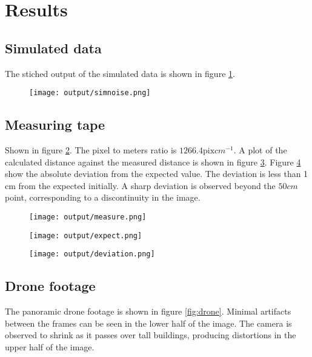 \section{Results}
\subsection{Simulated data}

The stiched output of the simulated data is shown in figure \ref{fig:simnoise}.

\begin{figure}
  \centering
  \texttt{[image: output/simnoise.png]}
  \caption{}
  \label{fig:simnoise}
\end{figure}

\subsection{Measuring tape}

Shown in figure \ref{fig:measure}.
The pixel to meters ratio is $1266.4 \text{pix} cm^{-1}$.
A plot of the calculated distance against the measured distance is shown in figure \ref{fig:expect}.
Figure \ref{fig:deviation} show the absolute deviation from the expected value.
The deviation is less than 1 cm from the expected initially.
A sharp deviation is observed beyond the $50 cm$ point,
corresponding to a discontinuity in the image.

\begin{figure}
  \centering
  \texttt{[image: output/measure.png]}
  \caption{}
  \label{fig:measure}
\end{figure}

\begin{figure}
  \centering
  \texttt{[image: output/expect.png]}
  \caption{}
  \label{fig:expect}
\end{figure}

\begin{figure}
  \centering
  \texttt{[image: output/deviation.png]}
  \caption{}
  \label{fig:deviation}
\end{figure}

\subsection{Drone footage}

The panoramic drone footage is shown in figure \ref{fig:drone}.
Minimal artifacts between the frames can be seen in the lower half of the image.
The camera is observed to shrink as it passes over tall buildings,
producing distortions in the upper half of the image.

